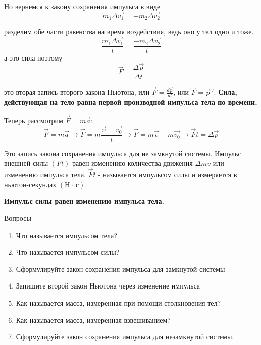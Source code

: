 \documentclass[a5paper, 10pt]{diss_4}
\renewcommand{\'}{\,'}
\begin{document}
 Но вернемся к закону сохранения импульса в виде
\[
m_1\Delta\vec{v_1}=-m_2\Delta\vec{v_2}
\]

разделим обе части равенства на время воздействия, ведь оно у тел одно и тоже.
\[
\frac{m_1\Delta\vec{v_1}}{t}=\frac{-m_2\Delta\vec{v_2}}{t}
\]
а это сила поэтому
\[
\vec{F}=\frac{\Delta\vec{p}}{\Delta t}
\]

 это вторая запись второго закона Ньютона, или $\vec{F}=\frac{d\vec{p}}{dt}$,
или $\vec{F}=\vec{p}\'$. \textbf{Сила, действующая на тело равна первой
производной импульса тела по времени.}

  Теперь рассмотрим $\vec{F}=m\vec{a}$:
\[
\vec{F}=m\vec{a}\to
\vec{F}=m\frac{\vec{v}=\vec{v_0}}{t}\to
\vec{F}=m\vec{v}-m\vec{v_0}\to
\vec{F}t=\Delta\vec{p}
\]

  Это запись закона сохранения импульса для не замкнутой системы. Импульс
внешней силы $(Ft)$ равен изменению количества движения $\Delta mv$ или
изменению импульса тела. $\vec{F}t$ - называется импульсом силы и измеряется
в ньютон-секундах $(Н\cdot\ с)$.

\textbf{Импульс силы равен изменению импульса тела.}

\begin{center}
   Вопросы
\end{center}
\begin{enumerate}
\item Что называется импульсом тела?
\item Что называется импульсом силы?
\item Сформулируйте закон сохранения импульса для замкнутой системы
\item Запишите второй закон Ньютона через изменение импульса
\item Как называется масса, измеренная при помощи столкновения тел?
\item Как называется масса, измеренная взвешиванием?
\item Сформулируйте закон сохранения импульса для незамкнутой системы.
\end{enumerate}
\end{document}
